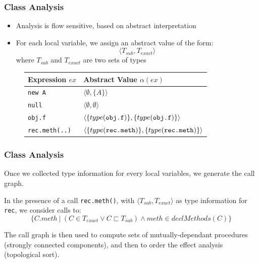 \documentclass[hyperref={pdfpagelabels=false}]{beamer}
\begin{document}
\begin{frame}[fragile]
    \frametitle{Class Analysis}
    \begin{itemize}
        \item Analysis is flow sensitive, based on abstract interpretation
        \item For each local variable, we assign an abstract value of the form:
        $$ \langle T_{sub}, T_{exact} \rangle $$ where $T_{sub}$ and
        $T_{exact}$ are two sets of types
    \end{itemize}

\begin{figure}
    \begin{tabular}{ l | l }
        Expression $ex$       & Abstract Value $\alpha(ex)$\\
        \hline
        \verb/new A/          & $\langle \emptyset, \{ A \} \rangle$ \\
        \verb/null/           & $\langle \emptyset, \emptyset \rangle$ \\
        \verb/obj.f/          & $\langle\{type(\verb/obj.f/)\}, \{type(\verb/obj.f/)\} \rangle$ \\
        \verb/rec.meth(..)/   & $\langle\{type(\verb/rec.meth/)\}, \{type(\verb/rec.meth/)\} \rangle$ \\
    \end{tabular}
\end{figure}
\end{frame}

\begin{frame}[fragile]
    \frametitle{Class Analysis}
    Once we collected type information for every local variables, we generate
    the call graph.

    In the presence of a call \lstinline{rec.meth()}, with
    $\langle T_{sub}, T_{exact} \rangle$ as type information for \lstinline{rec},
    we consider calls to:
    $$
    \{ C.meth ~|~ (C \in T_{exact} \lor C \sqsubset T_{sub}) \land meth \in declMethods(C)\}
    $$

    The call graph is then used to compute sets of mutually-dependant
    procedures (strongly connected components), and then to order the effect
    analysis (topological sort).
\end{frame}
\end{document}
